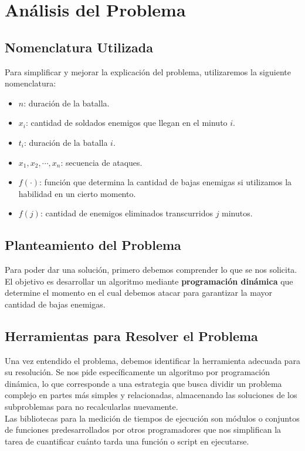 \section{Análisis del Problema}

\subsection{Nomenclatura Utilizada}
Para simplificar y mejorar la explicación del problema, utilizaremos la siguiente nomenclatura:
\begin{itemize}
\item $n$: duración de la batalla.
\item $x_i$: cantidad de soldados enemigos que llegan en el minuto $i$.
\item $t_i$: duración de la batalla $i$.
\item $x_1, x_2, \cdots, x_n$: secuencia de ataques.
\item $f(\cdot)$: función que determina la cantidad de bajas enemigas si utilizamos la habilidad en un cierto momento.
\item $f(j)$: cantidad de enemigos eliminados transcurridos $j$ minutos.
\end{itemize}

\subsection{Planteamiento del Problema}
Para poder dar una solución, primero debemos comprender lo que se nos solicita. El objetivo es desarrollar un algoritmo mediante \textbf{programación dinámica} que determine el momento en el cual debemos atacar para garantizar la mayor cantidad de bajas enemigas.

\subsection{Herramientas para Resolver el Problema}
Una vez entendido el problema, debemos identificar la herramienta adecuada para su resolución. Se nos pide específicamente un algoritmo por programación dinámica, lo que corresponde a una estrategia que busca dividir un problema complejo en partes más simples y relacionadas, almacenando las soluciones de los subproblemas para no recalcularlas nuevamente.\\ 
Las bibliotecas para la medición de tiempos de ejecución son módulos o conjuntos de funciones predesarrollados por otros programadores que nos simplifican la tarea de cuantificar cuánto tarda una función o script en ejecutarse.
